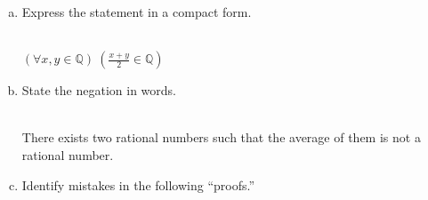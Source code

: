 \documentclass[12pt]{amsart}
\begin{document}
\begin{enumerate}[{\bfseries 1.}]
	\begin{enumerate}[(a)]
	\vspace{0.1in}
	\item Express the statement in a compact form.
	\begin{normalize}
	    \vspace{0.1in}
        \\$(\forall x, y\in\mathbb{Q})\ (\frac{x + y}{2}\in\mathbb{Q})$
        \\
    \end{normalize}
	\item State the negation in words.
	\begin{normalize}
	    \vspace{0.1in}
        \\There exists two rational numbers such that the average of them is not a rational number.
        \\
    \end{normalize}
	\item Identify mistakes in the following ``proofs.''


\end{enumerate}
\end{enumerate}
\end{document}
